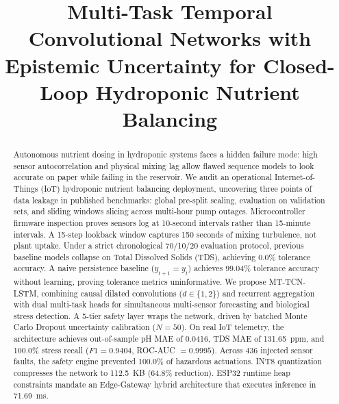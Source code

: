 \documentclass[conference]{IEEEtran}
\begin{document}
\title{Multi-Task Temporal Convolutional Networks with Epistemic Uncertainty for Closed-Loop Hydroponic Nutrient Balancing}

\author{
}

\maketitle

\begin{abstract}
Autonomous nutrient dosing in hydroponic systems faces a hidden failure mode: high sensor autocorrelation and physical mixing lag allow flawed sequence models to look accurate on paper while failing in the reservoir. We audit an operational Internet-of-Things (IoT) hydroponic nutrient balancing deployment, uncovering three points of data leakage in published benchmarks: global pre-split scaling, evaluation on validation sets, and sliding windows slicing across multi-hour pump outages. Microcontroller firmware inspection proves sensors log at 10-second intervals rather than 15-minute intervals. A 15-step lookback window captures 150 seconds of mixing turbulence, not plant uptake. Under a strict chronological 70/10/20 evaluation protocol, previous baseline models collapse on Total Dissolved Solids (TDS), achieving 0.0\% tolerance accuracy. A naive persistence baseline ($y_{t+1} = y_t$) achieves 99.04\% tolerance accuracy without learning, proving tolerance metrics uninformative. We propose MT-TCN-LSTM, combining causal dilated convolutions ($d \in \{1, 2\}$) and recurrent aggregation with dual multi-task heads for simultaneous multi-sensor forecasting and biological stress detection. A 5-tier safety layer wraps the network, driven by batched Monte Carlo Dropout uncertainty calibration ($N=50$). On real IoT telemetry, the architecture achieves out-of-sample pH MAE of 0.0416, TDS MAE of 131.65~ppm, and 100.0\% stress recall ($F1 = 0.9404$, ROC-AUC $= 0.9995$). Across 436 injected sensor faults, the safety engine prevented 100.0\% of hazardous actuations. INT8 quantization compresses the network to 112.5~KB (64.8\% reduction). ESP32 runtime heap constraints mandate an Edge-Gateway hybrid architecture that executes inference in 71.69~ms.
\end{abstract}
\end{document}
